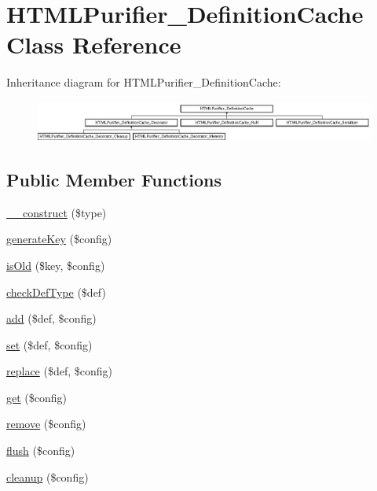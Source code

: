 \hypertarget{classHTMLPurifier__DefinitionCache}{\section{H\+T\+M\+L\+Purifier\+\_\+\+Definition\+Cache Class Reference}
\label{classHTMLPurifier__DefinitionCache}
}
Inheritance diagram for H\+T\+M\+L\+Purifier\+\_\+\+Definition\+Cache\+:\begin{figure}[H]
\begin{center}
\leavevmode
\includegraphics[height=1.350482cm]{classHTMLPurifier__DefinitionCache}
\end{center}
\end{figure}
\subsection*{Public Member Functions}
\begin{DoxyCompactItemize}
\item 
\hyperlink{classHTMLPurifier__DefinitionCache_a042a2ac7126aed715d72bb63237e6d6d}{\+\_\+\+\_\+construct} (\$type)
\item 
\hyperlink{classHTMLPurifier__DefinitionCache_ad7539bc2ffb9ea5b265a77c9b637ed90}{generate\+Key} (\$config)
\item 
\hyperlink{classHTMLPurifier__DefinitionCache_a72277cd4e70f55b832c4c0a62be9c299}{is\+Old} (\$key, \$config)
\item 
\hyperlink{classHTMLPurifier__DefinitionCache_a6a5c8ab1ace59edb11512d4be702fd93}{check\+Def\+Type} (\$def)
\item 
\hyperlink{classHTMLPurifier__DefinitionCache_ab8d3f87b500df5a017712a460ac6089f}{add} (\$def, \$config)
\item 
\hyperlink{classHTMLPurifier__DefinitionCache_a97f14d4f1c7c2e56d83fdb864175be7e}{set} (\$def, \$config)
\item 
\hyperlink{classHTMLPurifier__DefinitionCache_a637ea90220e4e334942de73c44bdbeb3}{replace} (\$def, \$config)
\item 
\hyperlink{classHTMLPurifier__DefinitionCache_ab1d78d8d8b3ec702d6f4258ae6f57347}{get} (\$config)
\item 
\hyperlink{classHTMLPurifier__DefinitionCache_a35f777c47c08d91d4be900cfe29f6191}{remove} (\$config)
\item 
\hyperlink{classHTMLPurifier__DefinitionCache_aa808399297121e2e0513805b56b290bd}{flush} (\$config)
\item 
\hyperlink{classHTMLPurifier__DefinitionCache_ae02d1e54f27c61e10d68eaccf003be2d}{cleanup} (\$config)
\end{DoxyCompactItemize}
